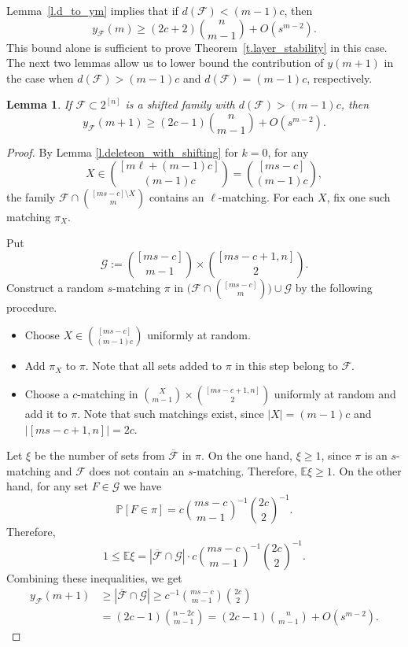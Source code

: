 \documentclass[12pt,a4paper]{article}
\newtheorem{lemma}{Lemma}
\newcommand{\m}{\mathcal}
\begin{document}
Lemma~\ref{l.d_to_ym} implies that if $d(\mathcal{F}) < (m-1)c$, then
\[
y_{\mathcal{F}}(m) \geq (2c+2){n \choose m - 1} + O(s^{m - 2}).
\]
This bound alone is sufficient to prove Theorem~\ref{t.layer_stability} in this case. The next two lemmas allow us to lower bound the contribution of $y(m+1)$ in the case when  $d(\mathcal{F}) > (m-1)c$ and $d(\mathcal{F}) = (m-1)c$, respectively.

\begin{lemma} \label{l.d_geq_mc-c+1}
    If $\mathcal{F} \subset 2^{[n]}$ is a shifted family with $d(\mathcal{F}) > (m-1)c$, then
    \[
    y_{\mathcal{F}}(m+1) \geq (2c-1){n \choose m - 1} + O(s^{m - 2}).
    \]
\end{lemma}

\begin{proof}
    By Lemma \ref{l.deleteon_with_shifting} for $k=0$, for any
    \[
    X \in {[m\ell+(m-1)c] \choose (m-1)c} = {[ms-c] \choose (m-1)c},
    \]
    the family $\mathcal{F} \cap {[ms-c] \setminus X \choose m}$ contains an $\ell$-matching. For each $X$, fix one such matching $\pi_{X}$.

    Put 
    \[ \m G:={[ms-c] \choose m-1} \times {[ms-c+1, n] \choose 2}.\]
    Construct a random $s$-matching $\pi$ in
    $
    \big(\mathcal{F} \cap {[ms-c] \choose m}\big) \cup \m G
    $
    by the following procedure.
    \begin{itemize}
        \item Choose $X \in {[ms-c] \choose (m-1)c}$ uniformly at random.
        \item Add $\pi_{X}$ to $\pi$. Note that all sets added to $\pi$ in this step belong to $\mathcal{F}$.
        \item Choose a $c$-matching in ${X \choose m-1} \times {[ms-c+1, n] \choose 2}$ uniformly at random and add it to $\pi$. Note that such matchings exist, since $|X|=(m-1)c$ and $|[ms-c+1, n]| = 2c$.
    \end{itemize}

    Let $\xi$ be the number of sets from $\overline{\mathcal{F}}$ in $\pi$. On the one hand, $\xi \geq 1$, since $\pi$ is an $s$-matching and $\mathcal{F}$ does not contain an $s$-matching. Therefore, $\mathbb{E}\xi \geq 1$. On the other hand, for any set $F \in \m G$ we have
    \[
    \mathbb{P}[F \in \pi] = c{ms-c \choose m-1}^{-1}{2c \choose 2}^{-1}.
    \]
    Therefore,
    \[
    1\le \mathbb{E}\xi = |\overline{\mathcal{F}} \cap \m G| \cdot c{ms-c \choose m-1}^{-1}{2c \choose 2}^{-1}.
    \]
    Combining these inequalities, we get
    \[
    \begin{split}
        y_{\mathcal{F}}(m+1)
        &\geq |\overline{\mathcal{F}} \cap \m G| 
        \geq c^{-1}{ms-c \choose m-1}{2c \choose 2} \\
        &= (2c-1){n-2c \choose m-1} 
        = (2c-1){n \choose m - 1} + O(s^{m - 2}).
    \end{split}
    \]
\end{proof}
\end{document}
